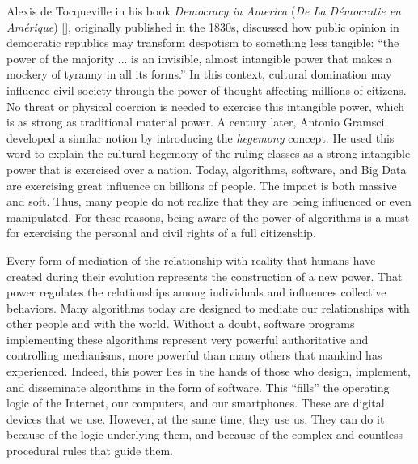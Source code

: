 Alexis de Tocqueville in his book \textit{Democracy in America} (\textit{De La D\'{e}mocratie en Am\'{e}rique}) [\citealt{chap:prolog:deTocqueville:2002}], originally published in the 1830s, discussed how public opinion in democratic republics may transform despotism to something less tangible: ``the power of the majority ... is an invisible, almost intangible power that makes a mockery of tyranny in all its forms.'' In this context, cultural domination may influence civil society through the power of thought affecting millions of citizens. No threat or physical coercion is needed to exercise this intangible power, which is as strong as traditional material power. A century later, Antonio \hbox{Gramsci} developed a similar notion by introducing the \textit{hegemony} concept. He used this word to explain the cultural hegemony of the ruling classes as a strong intangible power that is exercised over a nation. Today, algorithms, software, and Big Data are exercising great influence on billions of people. The impact is both massive and soft. Thus, many people do not realize that they are being influenced or even \hbox{manipulated.} For these reasons, being aware of the power of algorithms is a must for exercising the personal and civil rights of a full citizenship.

Every form of mediation of the relationship with reality that humans have created during their evolution represents the construction of a new power. That power regulates the relationships among individuals and influences collective behaviors. Many algorithms today are designed to mediate our relationships with other people and with the world. Without a doubt, software programs implementing these algorithms represent very powerful authoritative and controlling mechanisms, more powerful than many others that mankind has experienced. Indeed, this power lies in the hands of those who design, implement, and disseminate algorithms in the form of software. This ``fills'' the operating logic of the Internet, our computers, and our smartphones. These are digital devices that we use. However, at the same time, they use us. They can do it because of the logic underlying them, and because of the complex and countless procedural rules that guide them.

